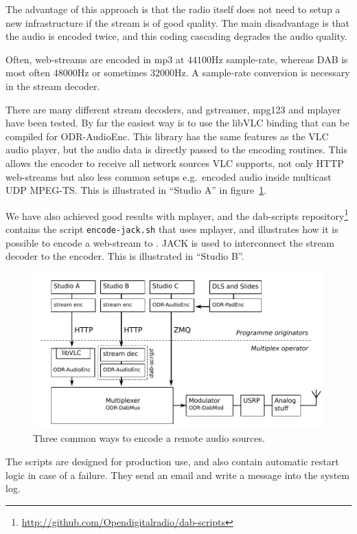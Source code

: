 The advantage of this approach is that the radio itself does not need to setup a
new infrastructure if the stream is of good quality. The main disadvantage is
that the audio is encoded twice, and this coding cascading degrades the audio
quality.

Often, web-streams are encoded in mp3 at $44100$Hz sample-rate, whereas DAB
is most often $48000$Hz or sometimes $32000$Hz. A sample-rate conversion is
necessary in the stream decoder.

There are many different stream decoders, and gstreamer, mpg123 and mplayer have
been tested. By far the easiest way is to use the libVLC binding that can be
compiled for ODR-AudioEnc. This library has
the same features as the VLC audio player, but the audio data is directly passed
to the encoding routines. This allows the encoder to receive all network
sources VLC supports, not only HTTP web-streams but also less common setups
e.g.\ encoded audio inside multicast UDP MPEG-TS.
This is illustrated in ``Studio A'' in figure~\ref{fig:txchain-with-encoders}.

We have also achieved good results with mplayer, and the dab-scripts
repository\footnote{\url{http://github.com/Opendigitalradio/dab-scripts}}
contains the script \texttt{encode-jack.sh} that uses mplayer, and illustrates
how it is possible to encode a web-stream to \dabplus. JACK is used to
interconnect the stream decoder to the \dabplus encoder.
This is illustrated in ``Studio B''.

\begin{figure}[h]
    \includegraphics[width=\textwidth]{figures/txchain-with-encoders.pdf}
    \caption{Three common ways to encode a remote audio sources.}
    \label{fig:txchain-with-encoders}
\end{figure}


The scripts are designed for production use, and also contain automatic restart
logic in case of a failure. They send an email and write a message into the
system log.

